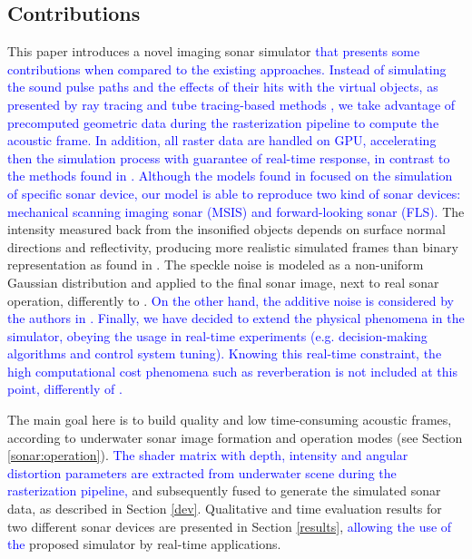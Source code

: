 \documentclass[final,5p,times]{elsarticle}
\begin{document}
\subsection{Contributions}

This paper introduces a novel imaging sonar simulator \textcolor{blue}{that presents some contributions when compared to the existing approaches. Instead of simulating the sound pulse paths and the effects of their hits with the virtual objects, as presented by ray tracing and tube tracing-based methods \cite{bell1997,coiras2009,sac2015,demarco2015,gu2013,kwak2015,gueriot2010},
we take advantage of precomputed geometric data during the rasterization
pipeline to compute the acoustic frame. In addition, all raster data are handled on GPU, accelerating then the simulation process with guarantee of
real-time response, in contrast to the methods found in
\cite{bell1997,coiras2009,sac2015,demarco2015}. Although the models found in \cite{bell1997,coiras2009,sac2015,demarco2015,gu2013,kwak2015,gueriot2010} focused on the simulation of specific sonar device, our model is able to reproduce two kind of sonar devices: mechanical scanning imaging sonar (MSIS)
and forward-looking sonar (FLS).} The intensity measured back from the
insonified objects depends on surface normal directions and reflectivity,
producing more realistic simulated frames than binary representation as
found in \cite{gu2013,kwak2015}. The speckle noise is modeled as a non-uniform Gaussian distribution and applied to the final sonar image, next to real sonar operation, differently to \cite{sac2015,demarco2015,gu2013,kwak2015,gueriot2010}. \textcolor{blue}{On the other hand, the additive noise is considered by the authors in \cite{sac2015,demarco2015}. Finally, we have decided to extend the physical phenomena in the simulator, obeying
the usage in real-time experiments (e.g. decision-making algorithms and control system tuning). Knowing this real-time constraint, the high computational cost phenomena such as reverberation is not included at this point, differently of \cite{sac2015}.}

The main goal here is to build quality and low time\hyp{}consuming acoustic frames, according to underwater sonar image formation and operation modes (see Section \ref{sonar:operation}). \textcolor{blue}{The shader matrix with depth, intensity and angular distortion parameters are extracted from underwater scene during the rasterization pipeline,} and subsequently fused to generate the simulated sonar data, as described in Section \ref{dev}. Qualitative and time evaluation results for two different sonar devices are presented in Section \ref{results}, \textcolor{blue}{allowing the use of the} proposed simulator by real-time applications.
\end{document}
